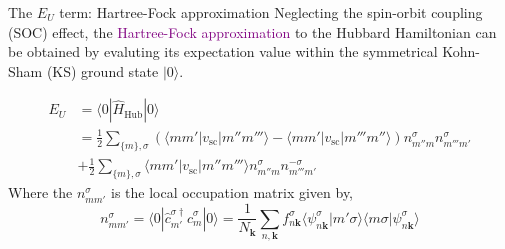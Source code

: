 \documentclass{beamer}
\newcommand{\purple}{\textcolor{purple}}
\begin{document}
  \begin{frame}{The \(E_U\) term: Hartree-Fock approximation}
    Neglecting the spin-orbit coupling (SOC) effect, the \purple{Hartree-Fock approximation} to the Hubbard Hamiltonian can be obtained by evaluting its expectation value within the symmetrical Kohn-Sham (KS) ground state \(|0\rangle\).

    \begin{equation}\label{eq:EU}
      \begin{aligned}
        E_U &= \langle{}0|\hat{H}_{\text{Hub}}|0\rangle\\
            &= \frac{1}{2}\sum_{\{m\},\sigma}\left(\langle{}mm'|v_{\text{sc}}|m''m'''\rangle - \langle{}mm'|v_{\text{sc}}|m'''m''\rangle\right)n_{m''m}^{\sigma}n_{m'''m'}^{\sigma}\\
            &+ \frac{1}{2}\sum_{\{m\},\sigma}\langle{}mm'|v_{\text{sc}}|m''m'''\rangle{}n_{m''m}^{\sigma}n_{m'''m'}^{-\sigma}
      \end{aligned}
    \end{equation}
    Where the \(n_{mm'}^{\sigma}\) is the local occupation matrix given by,
    \begin{equation}
      n_{mm'}^{\sigma} = \langle{}0|\hat{c}^{\sigma\dagger}_{m'}\hat{c}^{\sigma}_{m}|0\rangle = \frac{1}{N_{\bm{k}}}\sum_{n,\bm{k}}f^\sigma_{n\bm{k}}\langle\psi^\sigma_{n\bm{k}}|m'\sigma\rangle\langle{}m\sigma|\psi^\sigma_{n\bm{k}}\rangle
    \end{equation}
  \end{frame}
\end{document}
